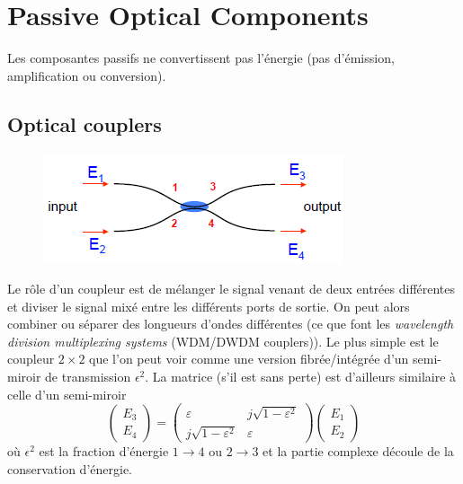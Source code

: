 \chapter{Passive Optical Components}
Les composantes passifs ne convertissent pas l'énergie (pas d'émission, amplification ou 
conversion).

\section{Optical couplers}
	\begin{figure}
	\vspace{-5mm}
	\includegraphics[scale=0.6]{ch3/image1}
	\end{figure}
Le rôle d'un coupleur est de mélanger le signal venant de deux entrées différentes et diviser le 
signal mixé entre les différents ports de sortie. On peut alors combiner ou séparer des longueurs
d'ondes différentes (ce que font les\textit{ wavelength division multiplexing systems} (WDM/DWDM
 couplers)). Le plus simple est le coupleur $2\times2$ que l'on peut voir comme une version 
 fibrée/intégrée d'un semi-miroir de transmission $\epsilon^2$. La matrice (s'il est sans perte) est
 d'ailleurs similaire à celle d'un semi-miroir
\begin{equation}
\left( {\begin{array}{*{20}{c}}
{{E_3}}\\
{{E_4}}
\end{array}} \right) = \left( {\begin{array}{*{20}{c}}
\varepsilon &{j\sqrt {1 - {\varepsilon ^2}} }\\
{j\sqrt {1 - {\varepsilon ^2}} }&\varepsilon 
\end{array}} \right)\left( {\begin{array}{*{20}{c}}
{{E_1}}\\
{{E_2}}
\end{array}} \right)
\end{equation}
où $\epsilon^2$ est la fraction d'énergie $1\to 4$ ou $2\to 3$ et la partie complexe découle de la
conservation d'énergie.


